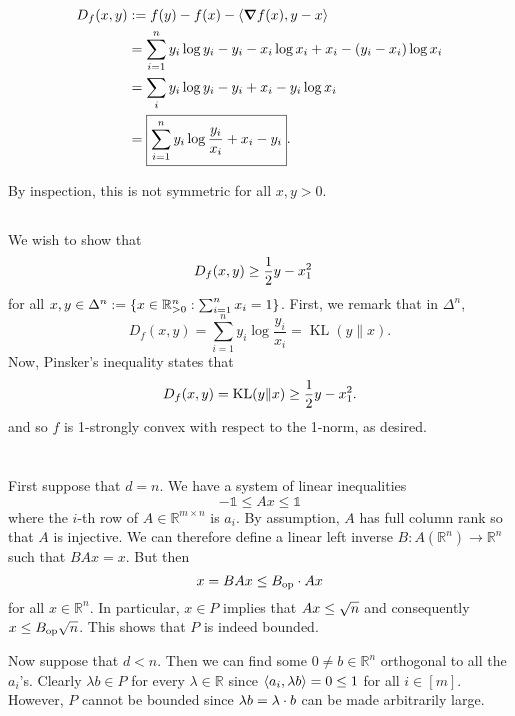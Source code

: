 \documentclass[10pt]{article}
\DeclarePairedDelimiter{\set}{\lbrace}{\rbrace}
\DeclarePairedDelimiter{\iprod}{\langle}{\rangle}
\let\abs\relax
\DeclarePairedDelimiter{\abs}{\lvert}{\rvert}
\let\norm\relax
\DeclarePairedDelimiter{\norm}{\lVert}{\rVert}
\DeclareMathOperator{\KL}{KL}
\DeclareMathOperator{\Op}{op}
\newcommand{\ones}{\mathds{1}}
\newcommand{\R}{\mathbb{R}}
\begin{document}
\subsection{}
\begin{align*}
  D_f(x, y)
  &:= f(y) - f(x) - \iprod{\grad f(x), y-x} \\
&= \sum_{i=1}^n y_i\log y_i- y_i - x_i\log x_i + x_i - (y_i-x_i)\log x_i \\
  &= \sum_i y_i\log y_i- y_i + x_i - y_i \log x_i \\
  &= \boxed{\sum_{i=1}^n y_i \log \frac{y_i}{x_i} + x_i - y_i}.
\end{align*}

By inspection,
this is not symmetric for all $x, y > 0$.

\subsection{}
We wish to show that
\begin{align*}
  D_f(x, y) &\geq \frac12 \norm{y-x}_1^2
\end{align*}
for all $x, y\in \Delta^n := \set{x\in \R_{>0}^n: \sum_{i=1}^n x_i = 1}$.
First,
we remark that in $\Delta^n$,
\[
  D_f(x, y) = \sum_{i=1}^n y_i \log \frac{y_i}{x_i}
  = \KL(y\| x).
\]
Now,
Pinsker's inequality states that
\[
  D_f(x, y) = \KL(y\| x)\geq \frac12 \norm{y-x}_1^2.
\]
and so $f$ is 1-strongly convex with respect to the 1-norm,
as desired.

\clearpage
\section{}
\subsection{}
First suppose that $d=n$.
We have a system of linear inequalities
\[
  -\ones\leq Ax\leq \ones
\]
where the $i$-th row of $A\in \R^{m\times n}$ is $a_i$.
By assumption,
$A$ has full column rank so that $A$ is injective.
We can therefore define a linear left inverse $B: A(\R^n)\to \R^n$ such that $BAx = x$.
But then
\[
  \norm{x} = \norm{BAx}\leq \norm{B}_{\Op}\cdot \norm{Ax}
\]
for all $x\in \R^n$.
In particular,
$x\in P$ implies that $\norm{Ax}\leq \sqrt{n}$
and consequently $\norm{x}\leq \norm{B}_{\Op}\sqrt n$.
This shows that $P$ is indeed bounded.

Now suppose that $d < n$.
Then we can find some $0\neq b\in \R^n$ orthogonal to all the $a_i$'s.
Clearly $\lambda b\in P$ for every $\lambda\in \R$
since $\iprod{a_i, \lambda b} = 0\leq 1$ for all $i\in [m]$.
However,
$P$ cannot be bounded since $\norm{\lambda b} = \abs{\lambda}\cdot \norm{b}$
can be made arbitrarily large.
\end{document}
